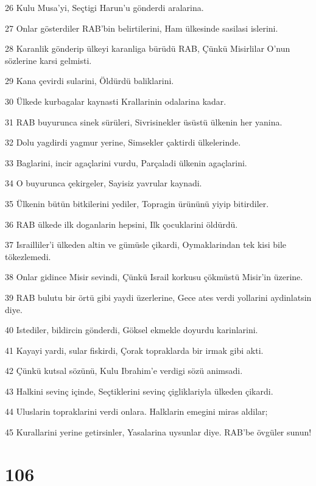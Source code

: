 \par 26 Kulu Musa'yi, Seçtigi Harun'u gönderdi aralarina.
\par 27 Onlar gösterdiler RAB'bin belirtilerini, Ham ülkesinde sasilasi islerini.
\par 28 Karanlik gönderip ülkeyi karanliga bürüdü RAB, Çünkü Misirlilar O'nun sözlerine karsi gelmisti.
\par 29 Kana çevirdi sularini, Öldürdü baliklarini.
\par 30 Ülkede kurbagalar kaynasti Krallarinin odalarina kadar.
\par 31 RAB buyurunca sinek sürüleri, Sivrisinekler üsüstü ülkenin her yanina.
\par 32 Dolu yagdirdi yagmur yerine, Simsekler çaktirdi ülkelerinde.
\par 33 Baglarini, incir agaçlarini vurdu, Parçaladi ülkenin agaçlarini.
\par 34 O buyurunca çekirgeler, Sayisiz yavrular kaynadi.
\par 35 Ülkenin bütün bitkilerini yediler, Topragin ürününü yiyip bitirdiler.
\par 36 RAB ülkede ilk doganlarin hepsini, Ilk çocuklarini öldürdü.
\par 37 Israilliler'i ülkeden altin ve gümüsle çikardi, Oymaklarindan tek kisi bile tökezlemedi.
\par 38 Onlar gidince Misir sevindi, Çünkü Israil korkusu çökmüstü Misir'in üzerine.
\par 39 RAB bulutu bir örtü gibi yaydi üzerlerine, Gece ates verdi yollarini aydinlatsin diye.
\par 40 Istediler, bildircin gönderdi, Göksel ekmekle doyurdu karinlarini.
\par 41 Kayayi yardi, sular fiskirdi, Çorak topraklarda bir irmak gibi akti.
\par 42 Çünkü kutsal sözünü, Kulu Ibrahim'e verdigi sözü animsadi.
\par 43 Halkini sevinç içinde, Seçtiklerini sevinç çigliklariyla ülkeden çikardi.
\par 44 Uluslarin topraklarini verdi onlara. Halklarin emegini miras aldilar;
\par 45 Kurallarini yerine getirsinler, Yasalarina uysunlar diye. RAB'be övgüler sunun!

\chapter{106}

